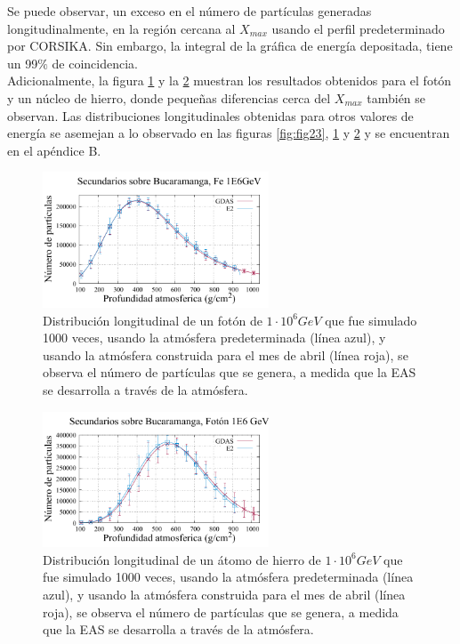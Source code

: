 Se puede observar, un exceso en el número de partículas generadas longitudinalmente, en la región cercana al $X_{max}$ usando el perfil predeterminado por CORSIKA. Sin embargo, la integral de la gráfica de energía depositada, tiene un 99$\%$ de coincidencia.\\

Adicionalmente, la figura \ref{fig:fig24} y la \ref{fig:fig25} muestran los resultados obtenidos para el fotón y un núcleo de hierro, donde pequeñas diferencias cerca del $X_{max}$ también se observan. Las distribuciones longitudinales obtenidas para otros valores de energía se asemejan a lo observado en las figuras \ref{fig:fig23}, \ref{fig:fig24} y \ref{fig:fig25} y se encuentran en el apéndice B.\\

\begin{figure}[htb!]
\centering
\includegraphics[width=0.6\textwidth]{Figs/longi_fe_1E6_E2_GDAS.pdf}
\caption[Distribución longitudinal de un fotón de $1\cdot 10^{6} GeV$.]{Distribución longitudinal de un fotón de $1\cdot 10^{6} GeV$ que fue simulado 1000 veces, usando la atmósfera predeterminada (línea azul), y usando la atmósfera construida para el mes de abril (línea roja), se observa el número de partículas que se genera, a medida que la EAS se desarrolla a través de la atmósfera.}
\label{fig:fig24}
\end{figure}

\begin{figure}[htb!]
\centering
\includegraphics[width=0.6\textwidth]{Figs/longi_foton_1E6_E2_GDAS.pdf}
\caption[Distribución longitudinal de un átomo de hierro de $1\cdot 10^{6} GeV$.]{Distribución longitudinal de un átomo de hierro de $1\cdot 10^{6} GeV$ que fue simulado 1000 veces, usando la atmósfera predeterminada (línea azul), y usando la atmósfera construida para el mes de abril (línea roja), se observa el número de partículas que se genera, a medida que la EAS se desarrolla a través de la atmósfera.}
\label{fig:fig25}
\end{figure}

